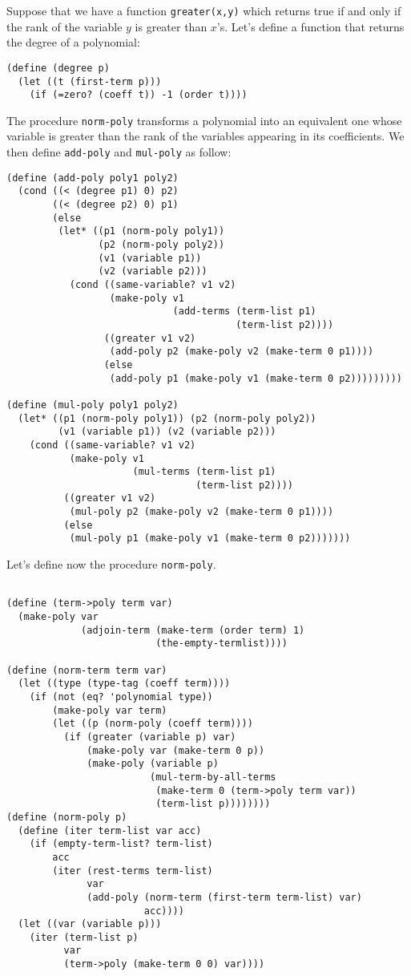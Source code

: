 \documentclass[a4paper,12pt]{article}
\begin{document}
Suppose that we have a function \lstinline!greater(x,y)! which returns
true if and only if the rank of the variable $y$ is greater than
$x$'s.  Let's define a function that returns the degree of a
polynomial:
\begin{lstlisting}
(define (degree p)
  (let ((t (first-term p)))
    (if (=zero? (coeff t)) -1 (order t))))
\end{lstlisting}
The procedure \lstinline!norm-poly! transforms a polynomial into an
equivalent one whose variable is greater than the rank of the
variables appearing in its coefficients.  We then define
\lstinline!add-poly!  and \lstinline!mul-poly! as follow:
\begin{lstlisting}
(define (add-poly poly1 poly2)
  (cond ((< (degree p1) 0) p2)
        ((< (degree p2) 0) p1)
        (else
         (let* ((p1 (norm-poly poly1))
                (p2 (norm-poly poly2))
                (v1 (variable p1))
                (v2 (variable p2)))
           (cond ((same-variable? v1 v2)
                  (make-poly v1
                             (add-terms (term-list p1)
                                        (term-list p2))))
                 ((greater v1 v2)
                  (add-poly p2 (make-poly v2 (make-term 0 p1))))
                 (else
                  (add-poly p1 (make-poly v1 (make-term 0 p2)))))))))

(define (mul-poly poly1 poly2)
  (let* ((p1 (norm-poly poly1)) (p2 (norm-poly poly2))
         (v1 (variable p1)) (v2 (variable p2)))
    (cond ((same-variable? v1 v2)
           (make-poly v1
                      (mul-terms (term-list p1)
                                 (term-list p2))))
          ((greater v1 v2)
           (mul-poly p2 (make-poly v2 (make-term 0 p1))))
          (else
           (mul-poly p1 (make-poly v1 (make-term 0 p2)))))))
\end{lstlisting}
Let's define now the procedure \lstinline!norm-poly!.
\begin{lstlisting}

(define (term->poly term var)
  (make-poly var
             (adjoin-term (make-term (order term) 1)
                          (the-empty-termlist))))

(define (norm-term term var)
  (let ((type (type-tag (coeff term))))
    (if (not (eq? 'polynomial type))
        (make-poly var term)
        (let ((p (norm-poly (coeff term))))
          (if (greater (variable p) var)
              (make-poly var (make-term 0 p))
              (make-poly (variable p)
                         (mul-term-by-all-terms
                          (make-term 0 (term->poly term var))
                          (term-list p))))))))
(define (norm-poly p)
  (define (iter term-list var acc)
    (if (empty-term-list? term-list)
        acc
        (iter (rest-terms term-list)
              var
              (add-poly (norm-term (first-term term-list) var)
                        acc))))
  (let ((var (variable p)))
    (iter (term-list p)
          var
          (term->poly (make-term 0 0) var))))
\end{lstlisting}
\end{document}
